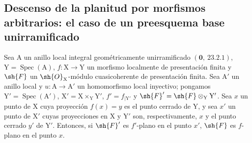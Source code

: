 \subsection{Descenso de la planitud por morfismos arbitrarios: el caso de un preesquema base unirramificado}
\label{subsection:IV.11.6}

\begin{theorem}[11.6.1]
\label{IV.11.6.1}
Sea $\mathrm{A}$ un anillo local integral geométricamente unirramificado
$(\mathbf{0},~23.2.1)$, $\mathrm{Y}=\operatorname{Spec}(\mathrm{A})$, $f:\mathrm{X}\to\mathrm{Y}$ un morfismo localmente de presentación finita y $\sh{F}$ un
$\sh{O}_\mathrm{X}$-módulo cuasicoherente de presentación finita. Sea $\mathrm{A}'$ un anillo local y $u:\mathrm{A}\to\mathrm{A}'$ un
homomorfismo local inyectivo; pongamos $\mathrm{Y}'=\operatorname{Spec}(\mathrm{A}')$, $\mathrm{X}'=\mathrm{X}\times_\mathrm{Y}\mathrm{Y}'$, $f'=f_{|\mathrm{Y}'}$ y $\sh{F}'=\sh{F}\otimes_\mathrm{Y}\mathrm{Y}'$. Sea $x$
un punto de $\mathrm{X}$ cuya proyección $f(x)=y$ es el punto cerrado de $\mathrm{Y}$, y sea $x'$ un punto de $\mathrm{X}'$ cuyas proyecciones
en $\mathrm{X}$ y $\mathrm{Y}'$ son, respectivamente, $x$ y el punto cerrado $y'$ de $\mathrm{Y}'$. Entonces, si $\sh{F}'$ es $f'$-plano en el punto $x'$,
$\sh{F}$ es $f$-plano en el punto $x$.
\end{theorem}

